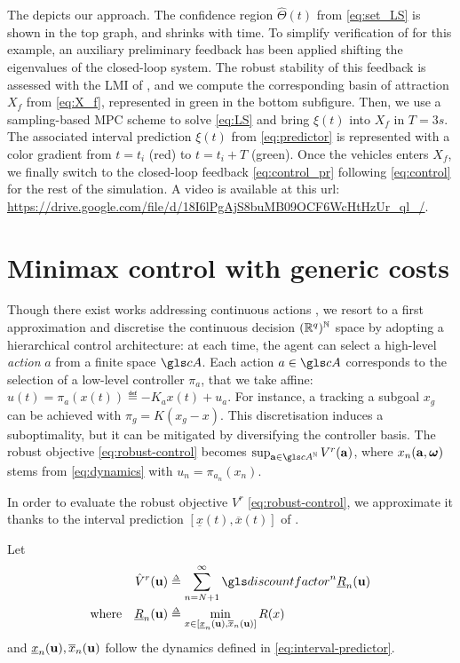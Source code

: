 The  depicts our approach. The confidence region $\hat{\Theta}(t)$ from \eqref{eq:set_LS} is shown in the top graph, and shrinks with time. To simplify verification of  for this example, an auxiliary preliminary feedback has been applied shifting the eigenvalues of the closed-loop system. The robust stability of this feedback is assessed with the LMI of , and we compute the corresponding basin of attraction $X_f$ from \eqref{eq:X_f}, represented in green in the bottom subfigure. Then, we use a sampling-based \gls{MPC} scheme \citep{HomemDeMello2014} to solve \eqref{eq:LS} and bring $\xi(t)$ into $X_f$ in $T=3s$.  The associated interval prediction $\xi(t)$ from \eqref{eq:predictor} is represented with a color gradient from $t=t_i$ (red) to $t=t_i+T$ (green). Once the vehicles enters $X_f$, we finally switch to the closed-loop feedback \eqref{eq:control_pr} following \eqref{eq:control} for the rest of the simulation. A video is available at this url: \url{https://drive.google.com/file/d/18I6lPgAjS8buMB09OCF6WcHtHzUr_ql_/}.


\section{Minimax control with generic costs}

Though there exist works addressing continuous actions \citep{Busoniu2018,Weinstein2012}, we resort to a first approximation and discretise the continuous decision $(\mathbb{R}^q)^{\mathbb{N}}$ space by adopting a hierarchical control architecture: at each time, the agent can select a high-level \emph{action} $a$ from a finite space $\cA$. Each action $a\in\cA$ corresponds to the selection of a low-level controller $\pi_a$, that we take affine: $u(t) = \pi_a(x(t)) \eqdef -K_a x(t) + u_a.$ For instance, a tracking a subgoal $x_g$ can be achieved with $\pi_g = K(x_g - x)$. This discretisation induces a suboptimality, but it can be mitigated by diversifying the controller basis.
The robust objective \eqref{eq:robust-control} becomes $\sup_{\ba\in{\cA}^\Natural} V^r(\ba)$, where $x_n(\mathbf{a}, \bm{\omega})$ stems from \eqref{eq:dynamics} with $u_n = \pi_{a_n}(x_n)$.

\label{sec:control}
In order to evaluate the robust objective $V^r$ \eqref{eq:robust-control}, we approximate it thanks to the interval prediction $[\underline{x}(t), \overline{x}(t)]$ of .

\begin{definition}
	\begin{leftbar}[defnbar]
	Let
	\begin{align}
	\label{eq:surrogate_objective} 
	\hat{V}^r(\bu) &\eqdef \sum_{n=N+1}^\infty \discount^n \underline{R}_n(\bu)\\ 
	\text{where}\quad\underline{R}_n(\bu) &\eqdef \min_{x\in[\underline{x}_n(\bu), \overline{x}_n(\bu)]}  R(x) \label{eq:pessimistic-rewards}
	\end{align}
	and $\underline{x}_n(\mathbf{u}), \overline{x}_n(\mathbf{u})$ follow the dynamics defined in \eqref{eq:interval-predictor}.
	\end{leftbar}
\end{definition}

